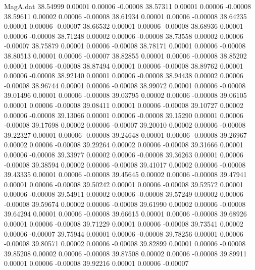 \begin{filecontents}{MagA.dat}
  38.54999    0.00001    0.00006   -0.00008
  38.57311    0.00001    0.00006   -0.00008
  38.59611    0.00002    0.00006   -0.00008
  38.61934    0.00001    0.00006   -0.00008
  38.64235    0.00001    0.00006   -0.00007
  38.66532    0.00001    0.00006   -0.00008
  38.68936    0.00001    0.00006   -0.00008
  38.71248    0.00002    0.00006   -0.00008
  38.73558    0.00002    0.00006   -0.00007
  38.75879    0.00001    0.00006   -0.00008
  38.78171    0.00001    0.00006   -0.00008
  38.80513    0.00001    0.00006   -0.00007
  38.82855    0.00001    0.00006   -0.00008
  38.85202    0.00001    0.00006   -0.00008
  38.87494    0.00001    0.00006   -0.00008
  38.89762    0.00001    0.00006   -0.00008
  38.92140    0.00001    0.00006   -0.00008
  38.94438    0.00002    0.00006   -0.00008
  38.96744    0.00001    0.00006   -0.00008
  38.99072    0.00001    0.00006   -0.00008
  39.01496    0.00001    0.00006   -0.00008
  39.03795    0.00002    0.00006   -0.00008
  39.06105    0.00001    0.00006   -0.00008
  39.08411    0.00001    0.00006   -0.00008
  39.10727    0.00002    0.00006   -0.00008
  39.13066    0.00001    0.00006   -0.00008
  39.15290    0.00001    0.00006   -0.00008
  39.17698    0.00002    0.00006   -0.00007
  39.20010    0.00002    0.00006   -0.00008
  39.22327    0.00001    0.00006   -0.00008
  39.24648    0.00001    0.00006   -0.00008
  39.26967    0.00002    0.00006   -0.00008
  39.29264    0.00002    0.00006   -0.00008
  39.31666    0.00001    0.00006   -0.00008
  39.33977    0.00002    0.00006   -0.00008
  39.36263    0.00001    0.00006   -0.00008
  39.38594    0.00002    0.00006   -0.00008
  39.41017    0.00002    0.00006   -0.00008
  39.43335    0.00001    0.00006   -0.00008
  39.45645    0.00002    0.00006   -0.00008
  39.47941    0.00001    0.00006   -0.00008
  39.50242    0.00001    0.00006   -0.00008
  39.52572    0.00001    0.00006   -0.00008
  39.54911    0.00002    0.00006   -0.00008
  39.57249    0.00002    0.00006   -0.00008
  39.59674    0.00002    0.00006   -0.00008
  39.61990    0.00002    0.00006   -0.00008
  39.64294    0.00001    0.00006   -0.00008
  39.66615    0.00001    0.00006   -0.00008
  39.68926    0.00001    0.00006   -0.00008
  39.71229    0.00001    0.00006   -0.00008
  39.73541    0.00002    0.00006   -0.00007
  39.75944    0.00001    0.00006   -0.00008
  39.78256    0.00001    0.00006   -0.00008
  39.80571    0.00002    0.00006   -0.00008
  39.82899    0.00001    0.00006   -0.00008
  39.85208    0.00002    0.00006   -0.00008
  39.87508    0.00002    0.00006   -0.00008
  39.89911    0.00001    0.00006   -0.00008
  39.92216    0.00001    0.00006   -0.00007

\end{filecontents}
